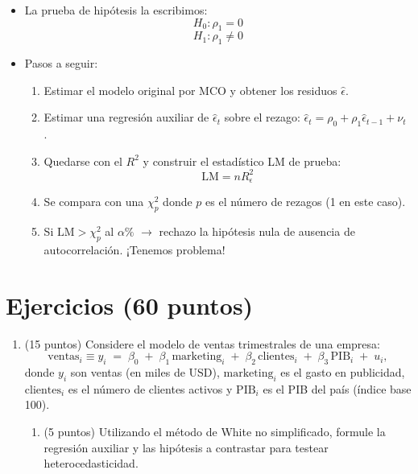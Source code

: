 \documentclass[10pt,a4paper]{article}
\begin{document}
\begin{enumerate}
\begin{enumerate}
\begin{itemize}
  \item La prueba de hipótesis la escribimos:
  \[
  H_0 : \rho_1 = 0
  \]
  \[
  H_1 : \rho_1 \neq 0
  \]
  \item Pasos a seguir:
  \begin{enumerate}
    \item Estimar el modelo original por MCO y obtener los residuos \(\hat{\epsilon}\).
    \item Estimar una regresión auxiliar de \(\hat{\epsilon}_t\) sobre el rezago: \(\hat{\epsilon}_t = \rho_0 + \rho_1 \hat{\epsilon}_{t-1}+ \nu_t\) .
    \item Quedarse con el \(R^2\) y construir el estadístico LM de prueba:
    \[
    \text{LM} = nR^2_\epsilon
    \]
    \item Se compara con una \(\chi^2_p\) donde \(p\) es el número de rezagos (1 en este caso).
    \item Si \(\text{LM} > \chi^2_p\) al \(\alpha \%\) \(\rightarrow\) rechazo la hipótesis nula de ausencia de autocorrelación. ¡Tenemos problema!
  \end{enumerate}
\end{itemize}

\end{enumerate}




\section{Ejercicios (60 puntos)}

\begin{enumerate}
    



      \color{black}  
    \item (15 puntos) Considere el modelo de ventas trimestrales de una empresa:
\[
\text{ventas}_i \equiv y_i \;=\; \beta_0 \;+\; \beta_1\,\text{marketing}_i \;+\; \beta_2\,\text{clientes}_i \;+\; \beta_3\,\text{PIB}_i \;+\; u_i,
\]
donde \(y_i\) son ventas (en miles de USD), \(\text{marketing}_i\) es el gasto en publicidad,
\(\text{clientes}_i\) es el número de clientes activos y \(\text{PIB}_i\) es el PIB del país (índice base 100).

\begin{enumerate}
\item (5 puntos) Utilizando el método de White no simplificado, formule la {regresión auxiliar} y las {hipótesis} a contrastar para testear heterocedasticidad.


\end{enumerate}
\end{enumerate}
\end{enumerate}
\end{document}
